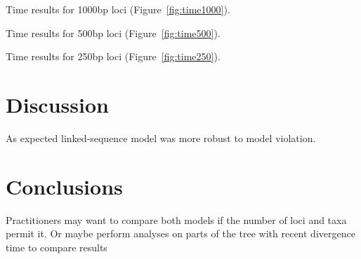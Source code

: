 Time results for 1000bp loci (Figure~\ref{fig:time1000}).

Time results for 500bp loci (Figure~\ref{fig:time500}).

Time results for 250bp loci (Figure~\ref{fig:time250}).

\section{Discussion}

As expected linked-sequence model was more robust to model violation.




\section{Conclusions}

Practitioners may want to compare both models if the number of loci and taxa
permit it. Or maybe perform analyses on parts of the tree with recent divergence
time to compare results 